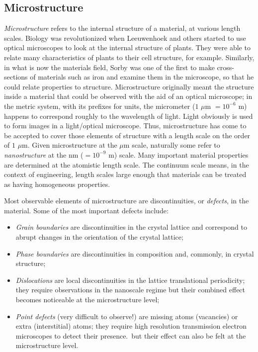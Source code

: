 \subsection{Microstructure\label{ssec:microstructure}}
\textit{Microstructure} refers to the internal structure of a material, at various length scales.  Biology was revolutionized when Leeuwenhoek and others started to use optical microscopes to look at the internal structure of plants.  They were able to relate many characteristics of plants to their cell structure, for example.  Similarly, in what is now the materials field, Sorby was one of the first to make cross-sections of materials such as iron and examine them in the microscope, so that he could relate properties to structure.  Microstructure originally meant the structure inside a material that could be observed with the aid of an optical microscope; in the metric system, with its prefixes for units, the micrometer ($1$ $\mu$m $= 10^{-6}$ m) happens to correspond roughly to the wavelength of light.  Light obviously is used to form images in a light/optical microscope.  Thus, microstructure has come to be accepted to cover those elements of structure with a length scale on the order of $1$ $\mu$m.  Given microstructure at the $\mu$m scale, naturally some refer to \textit{nanostructure} at the nm ($=10^{-9}$ m) scale.  Many important material properties are determined at the atomistic length scale. The continuum scale means, in the context of engineering, length scales large enough that materials can be treated as having homogeneous properties.

Most observable elements of microstructure are discontinuities, or \textit{defects}, in the material.  Some of the most important defects include:
\begin{itemize}
	\item \textit{Grain boundaries} are discontinuities in the crystal lattice and correspond to abrupt changes in the orientation of the crystal lattice;
	\item \textit{Phase boundaries} are discontinuities in composition and, commonly, in crystal structure;
	\item \textit{Dislocations} are local discontinuities in the lattice translational periodicity; they require observations in the nanoscale regime but their combined effect becomes noticeable at the microstructure level;
	\item \textit{Point defects} (very difficult to observe!) are missing atoms (vacancies) or extra (interstitial) atoms; they require high resolution transmission electron microscopes to detect their presence.\, but their effect can also be felt at the microstructure level.
\end{itemize}

